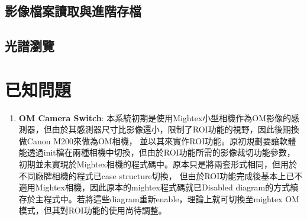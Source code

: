 \documentclass[12pt]{article}
\begin{document}
    \subsection{影像檔案讀取與進階存檔}
    \subsection{光譜瀏覽}
    \section{已知問題}
    \begin{enumerate}
        \item \textbf{OM Camera Switch}: 本系統初期是使用Mightex小型相機作為OM影像的感測器，但由於其感測器尺寸比影像還小，限制了ROI功能的視野，因此後期換做Canon M200來做為OM相機，
        並以其來實作ROI功能。原初規劃要讓軟體能透過init檔在兩種相機中切換，但由於ROI功能所需的影像裁切功能參數，初期並未實現於Mightex相機的程式碼中。原本只是將兩套形式相同，但用於不同廠牌相機的程式已case structure切換，
        但由於ROI功能完成後基本上已不適用Mightex相機，因此原本的mightex程式碼就已Disabled diagram的方式續存於主程式中。若將這些diagram重新enable，理論上就可切換至mightex OM模式，但其對ROI功能的使用尚待調整。
    \end{enumerate}
\end{document}
